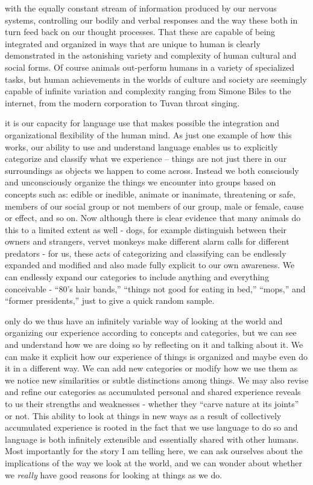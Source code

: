 \documentclass[justified]{tufte-book}
\begin{document}
 with the equally constant stream of information produced by our nervous systems, controlling our bodily and verbal responses and the way these both in turn feed back on our thought processes. That these are capable of being integrated and organized in ways that are unique to human is clearly demonstrated in the astonishing variety and complexity of human cultural and social forms. Of course animals out-perform humans in a variety of specialized tasks, but human achievements in the worlds of culture and society are seemingly capable of infinite variation and complexity ranging from Simone Biles to the internet, from the modern corporation to Tuvan throat singing.

 it is our capacity for language use that makes possible the integration and organizational flexibility of the human mind. As just one example of how this works, our ability to use and understand language enables us to explicitly categorize and classify what we experience -- things are not just there in our surroundings as objects we happen to come across. Instead we both consciously and unconsciously organize the things we encounter into groups based on concepts such as: edible or inedible, animate or inanimate, threatening or safe, members of our social group or not members of our group, male or female, cause or effect, and so on. Now although there is clear evidence that many animals do this to a limited extent as well - dogs, for example distinguish between their owners and strangers, vervet monkeys make different alarm calls for different predators - for us, these acts of categorizing and classifying can be endlessly expanded and modified and also made fully explicit to our own awareness. We can endlessly expand our categories to include anything and everything conceivable - ``80's hair bands,'' ``things not good for eating in bed,'' ``mops,'' and ``former presidents,'' just to give a quick random sample.

 only do we thus have an infinitely variable way of looking at the world and organizing our experience according to concepts and categories, but we can see and understand how we are doing so by reflecting on it and talking about it. We can make it explicit how our experience of things is organized and maybe even do it in a different way. We can add new categories or modify how we use them as we notice new similarities or subtle distinctions among things. We may also revise and refine our categories as accumulated personal and shared experience reveals to us their strengths and weaknesses - whether they ``carve nature at its joints'' or not. This ability to look at things in new ways as a result of collectively accumulated experience is rooted in the fact that we use language to do so and language is both infinitely extensible and essentially shared with other humans. Most importantly for the story I am telling here, we can ask ourselves about the implications of the way we look at the world, and we can wonder about whether we \emph{really} have good reasons for looking at things as we do.
\end{document}
